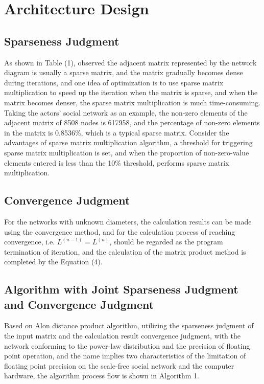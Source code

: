 \documentclass[10pt,twocolumn,letterpaper]{article}
\begin{document}
\section{Architecture Design}

\subsection{Sparseness Judgment}

As shown in Table (1), observed the adjacent matrix represented by the network diagram is usually a sparse matrix, and the matrix gradually becomes dense during iterations,
and one idea of optimization is to use sparse matrix multiplication to speed up the iteration when the matrix is sparse, and when the matrix becomes denser, the sparse matrix multiplication is much time-consuming.
Taking the actors' social network as an example, the non-zero elements of the adjacent matrix of 8508 nodes is 617958, and the percentage of non-zero elements in the matrix is 0.8536\%, which is a typical sparse matrix.
Consider the advantages of sparse matrix multiplication algorithm, a threshold for triggering sparse matrix multiplication is set,
and when the proportion of non-zero-value elements entered is less than the 10\% threshold, performs sparse matrix multiplication.

\subsection{Convergence Judgment}

For the networks with unknown diameters, the calculation results can be made using the convergence method, and for the calculation process of reaching convergence,
i.e. $L^{(n-1)}=L^{(n)}$, should be regarded as the program termination of iteration, and the calculation of the matrix product method is completed by the Equation (4).

\subsection{Algorithm with Joint Sparseness Judgment and Convergence Judgment}

Based on Alon \etal distance product algorithm, utilizing the sparseness judgment of the input matrix and the calculation result convergence judgment,
with the network conforming to the power-law distribution and the precision of floating point operation, and the name implies two characteristics of the limitation
of floating point precision on the scale-free social network and the computer hardware, the algorithm process flow is shown in Algorithm 1.
\end{document}
